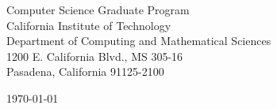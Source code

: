 \begin{minipage}{0.49\textwidth}
\begin{flushleft}
\noindent
Computer Science Graduate Program\\
California Institute of Technology\\
Department of Computing and Mathematical Sciences\\
1200 E. California Blvd., MS 305-16\\
Pasadena, California 91125-2100
\end{flushleft}
\end{minipage}
\begin{minipage}{0.47\textwidth}
\begin{flushright}
\today
\end{flushright}
\end{minipage} \\

\newcommand{\univ}{California Institute of Technology}
\newcommand{\univshort}{Caltech}
\newcommand{\degree}{Ph.D.}
\newcommand{\dept}{Computer Science}
